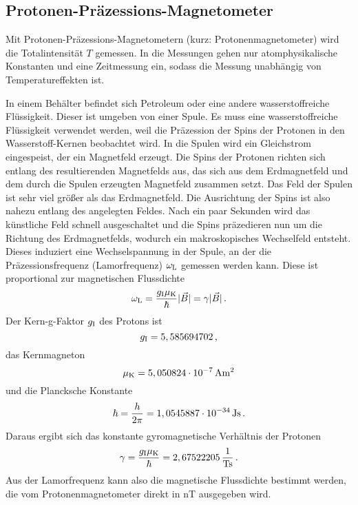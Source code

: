 \subsection{Protonen-Präzessions-Magnetometer}

Mit Protonen-Präzessions-Magnetometern (kurz: Protonenmagnetometer) wird die Totalintensität $T$ gemessen. In die Messungen gehen nur atomphysikalische Konstanten und eine Zeitmessung ein, sodass die Messung unabhängig von Temperatureffekten ist.

In einem Behälter befindet sich Petroleum oder eine andere wasserstoffreiche Flüssigkeit. Dieser ist umgeben von einer Spule. Es muss eine wasserstoffreiche Flüssigkeit verwendet werden, weil die Präzession der Spins der Protonen in den Wasserstoff-Kernen beobachtet wird. In die Spulen wird ein Gleichstrom eingespeist, der ein Magnetfeld erzeugt. Die Spins der Protonen richten sich entlang des resultierenden Magnetfelds aus, das sich aus dem Erdmagnetfeld und dem durch die Spulen erzeugten Magnetfeld zusammen setzt. Das Feld der Spulen ist sehr viel größer als das Erdmagnetfeld. Die Ausrichtung der Spins ist also nahezu entlang des angelegten Feldes. Nach ein paar Sekunden wird das künstliche Feld schnell ausgeschaltet und die Spins präzedieren nun um die Richtung des Erdmagnetfelds, wodurch ein makroskopisches Wechselfeld entsteht. Dieses induziert eine Wechselspannung in der Spule, an der die Präzessionsfrequenz (Lamorfrequenz) $\omega_{\mathrm{L}}$ gemessen werden kann. Diese ist proportional zur magnetischen Flussdichte
\begin{equation}
 \omega_{\mathrm{L}}=\frac{g_{\mathrm{I}}\mu_{\mathrm{K}}}{\hbar}|\vec{B}|=\gamma |\vec{B}| \text{\,.}
\end{equation}
Der Kern-g-Faktor $g_{\mathrm{I}}$ des Protons ist
\begin{equation}
 g_{\mathrm{I}}=5,585694702\text{\,,}
\end{equation}
das Kernmagneton
\begin{equation}
 \mu_{\mathrm{K}}=5,050824\cdot 10^{-7}\,\mathrm{Am^2}
\end{equation}
und die Plancksche Konstante
\begin{equation}
 \hbar=\frac{h}{2\pi}=1,0545887\cdot 10^{-34}\,\mathrm{Js} \text{\,.}
\end{equation}
Daraus ergibt sich das konstante gyromagnetische Verhältnis der Protonen
\begin{equation}
 \gamma=\frac{g_{\mathrm{I}}\mu_{\mathrm{K}}}{\hbar}=2,67522205\,\frac{\mathrm{1}}{\mathrm{Ts}} \text{\,.}
\end{equation}
Aus der Lamorfrequenz kann also die magnetische Flussdichte bestimmt werden, die vom Protonenmagnetometer direkt in nT ausgegeben wird.

